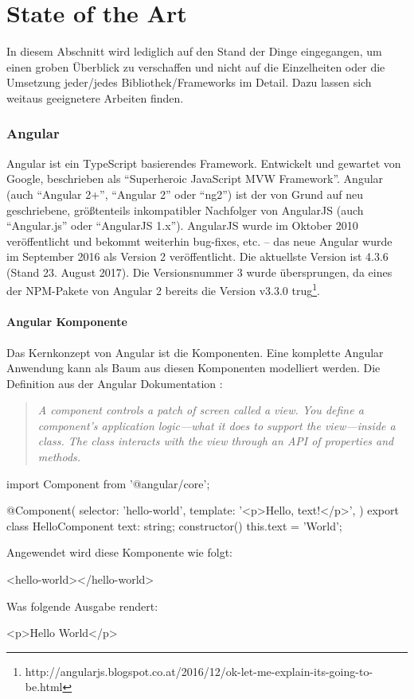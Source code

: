 \chapter{State of the Art}
\label{cha:StateOfTheArt}
In diesem Abschnitt wird lediglich auf den Stand der Dinge eingegangen, um einen groben Überblick zu verschaffen und nicht auf die Einzelheiten oder die Umsetzung jeder/jedes Bibliothek/Frameworks im Detail. Dazu lassen sich weitaus geeignetere Arbeiten finden.

\subsection{Angular}
Angular ist ein TypeScript basierendes Framework. Entwickelt und gewartet von Google, beschrieben als "`Superheroic JavaScript MVW Framework"'. Angular (auch "`Angular 2+"', "`Angular 2"' oder "`ng2"') ist der von Grund auf neu geschriebene, größtenteils inkompatibler Nachfolger von AngularJS (auch "`Angular.js"' oder "`AngularJS 1.x"').
AngularJS wurde im Oktober 2010 veröffentlicht und bekommt weiterhin bug-fixes, etc. -- das neue Angular wurde im September 2016 als Version 2 veröffentlicht. Die aktuellste Version ist 4.3.6 (Stand 23. August 2017). Die Versionsnummer 3 wurde übersprungen, da eines der NPM-Pakete von Angular 2 bereits die Version v3.3.0 trug\footnote{http://angularjs.blogspot.co.at/2016/12/ok-let-me-explain-its-going-to-be.html}.

\subsubsection{Angular Komponente}
Das Kernkonzept von Angular ist die Komponenten. Eine komplette Angular Anwendung kann als Baum aus diesen Komponenten modelliert werden.
Die Definition aus der Angular Dokumentation \cite{angular-component}: 
\begin{quote}
	\begin{english}
	\textit{A component controls a patch of screen called a view. You define a component's application logic—what it does to support the view—inside a class. The class interacts with the view through an API of properties and methods.}
	\end{english}
\end{quote}

\begin{JsCode}
	import { Component } from '@angular/core';
	
	@Component({
		selector: 'hello-world',
		template: '<p>Hello, {{text}}!</p>',
	})
	export class HelloComponent {
		text: string;
		constructor() {
			this.text = 'World';
		}
	}
\end{JsCode}
Angewendet wird diese Komponente wie folgt:
\begin{JsCode}[numbers=none]
	<hello-world></hello-world>
\end{JsCode}
Was folgende Ausgabe rendert:
\begin{JsCode}Hello World</p>
\end{JsCode}

